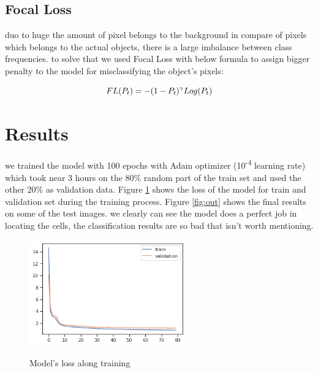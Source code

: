 \documentclass[11pt]{article}
\begin{document}
\subsection{Focal Loss}

duo to huge the amount of pixel belongs to the background in compare of pixels which belongs to the actual objects, there is a large imbalance between class frequencies. to solve that we used Focal Loss with below formula to assign bigger penalty to the model for misclassifying the object's pixels:

\begin{equation}
	\label{eq:focal}
	\text{$ FL(P_{t}) = - (1 - P_{t})^{\gamma} Log(P_{t}) $}
\end{equation}

\section{Results}

we trained the model with 100 epochs with Adam optimizer (10\textsuperscript{-4} learning rate) which took near 3 hours on the 80\% random part of the train set and used the other 20\% as validation data. Figure \ref{fig:loss_2} shows the loss of the model for train and validation set during the training process. Figure \ref{fig:out} shows the final results on some of the test images. we clearly can see the model does a perfect job in locating the cells, the classification results are so bad that isn't worth mentioning.

\begin{figure}
	\centering
	\caption{Model's loss along training}
	\includegraphics[width=0.6\textwidth]{loss_3}
	\label{fig:loss_2}
\end{figure}
\end{document}
